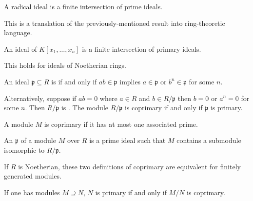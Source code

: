 \documentclass [11 pt, oneside, margin = 1 in] {article}
\begin{document}
\begin{theorem}[ ]\label{}\index{}\text{}
A radical ideal is a finite intersection of prime ideals.
\end{theorem}

This is a translation of the previously-mentioned result into ring-theoretic language.
\begin{theorem}[Lasker]\label{}\index{}\text{}
An ideal of $K[x_1,\hdots, x_n]$ is a finite intersection of primary ideals.
\end{theorem}
\begin{theorem}[Noether]\label{}\index{}\text{}
This holds for ideals of Noetherian rings.
\end{theorem}

\begin{definition}\label{}\text{}
An ideal $\mathfrak{p}\subseteq R$ is  if and only if $ab\in \mathfrak{p}$ implies $a\in \mathfrak{p}$ or $b^n\in \mathfrak{p}$ for some $n$.
\end{definition}

Alternatively, suppose if $ab=0$ where $a\in R$ and $b\in R/\mathfrak{p}$ then $b=0$ or $a^n=0$ for some $n$. Then $R/\mathfrak{p}$ is . The module $R/\mathfrak{p}$ is coprimary if and only if $\mathfrak{p}$ is primary.

\begin{definition}[ ]\label{}\text{}
A module $M$ is coprimary if it has at most one associated prime.
\end{definition}

\begin{definition}[ ]\label{}\text{}
An  $\mathfrak{p}$ of a module $M$ over $R$ is a prime ideal such that $M$ contains a submodule isomorphic to $R/\mathfrak{p}$.
\end{definition}
\begin{remark}
If $R$ is Noetherian, these two definitions of coprimary are equivalent for finitely generated modules.
\end{remark}

If one has modules $M\supseteq N$, $N$ is primary if and only if $M/N$ is coprimary.
\end{document}
